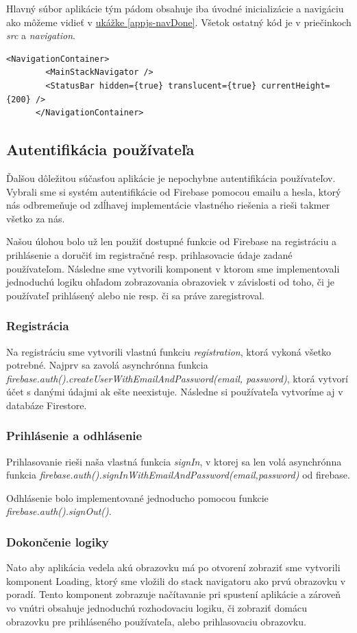 Hlavný súbor aplikácie tým pádom obsahuje iba úvodné inicializácie a navigáciu ako môžeme vidieť v  \hyperref[appjs-navDone]{ukážke \ref{appjs-navDone}}. Všetok ostatný kód je v priečinkoch \textit{src} a \textit{navigation}.
\begin{lstlisting}[caption={Ukážka z App.js po implementácií navigácie}, label={appjs-navDone}] 
      <NavigationContainer>
        <MainStackNavigator />
        <StatusBar hidden={true} translucent={true} currentHeight={200} />
      </NavigationContainer>
\end{lstlisting}

\subsection{Autentifikácia používateľa}
Ďalšou dôležitou súčasťou aplikácie je nepochybne autentifikácia používateľov. Vybrali sme si systém autentifikácie od Firebase pomocou emailu a hesla, ktorý nás odbremeňuje od zdĺhavej implementácie vlastného riešenia a rieši takmer všetko za nás. 

Našou úlohou bolo už len použiť dostupné funkcie od Firebase na registráciu a prihlásenie a doručiť im registračné resp. prihlasovacie údaje zadané používateľom. Následne sme vytvorili komponent v ktorom sme implementovali jednoduchú logiku ohľadom zobrazovania obrazoviek v závislosti od toho, či je používateľ prihlásený alebo nie resp. či sa práve zaregistroval.
\subsubsection{Registrácia}
Na registráciu sme vytvorili vlastnú funkciu \textit{registration}, ktorá vykoná všetko potrebné. Najprv sa zavolá asynchrónna funkcia \textit{firebase.auth().createUserWithEmailAndPassword(email, password)}, ktorá vytvorí účet s danými údajmi ak ešte neexistuje. Následne si používateľa vytvoríme aj v databáze Firestore. 
\subsubsection{Prihlásenie a odhlásenie}
Prihlasovanie rieši naša vlastná funkcia \textit{signIn}, v ktorej sa len volá asynchrónna funkcia \textit{firebase.auth().signInWithEmailAndPassword(email,password)} od firebase. 

Odhlásenie bolo implementované jednoducho pomocou funkcie \textit{firebase.auth().signOut()}.
\subsubsection{Dokončenie logiky}
Nato aby aplikácia vedela akú obrazovku má po otvorení zobraziť sme vytvorili komponent Loading, ktorý sme vložili do stack navigatoru ako prvú obrazovku v poradí. Tento komponent zobrazuje načítavanie pri spustení aplikácie a zároveň vo vnútri obsahuje jednoduchú rozhodovaciu logiku, či zobraziť domácu obrazovku pre prihláseného používateľa, alebo prihlasovaciu obrazovku. 

